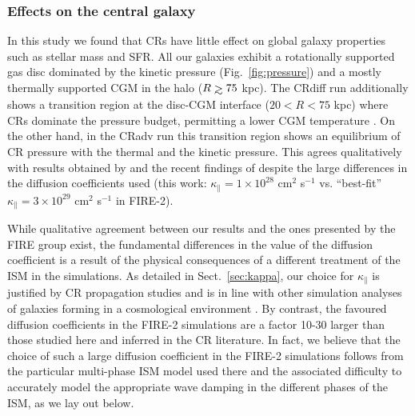 \documentclass[useAMS,usenatbib]{mnras}
\def\gtrsim{\mathrel{\hbox{\rlap{\hbox{\lower4pt\hbox{$\sim$}}}\hbox{$>$}}}}
\begin{document}
\subsubsection{Effects on the central galaxy}

In this study we found that CRs have little effect on global galaxy properties such as stellar mass and SFR. All our galaxies exhibit a rotationally supported gas disc dominated by the kinetic pressure (Fig.\ \ref{fig:pressure}) and a mostly thermally supported CGM in the halo ($R\gtrsim75$ kpc). The CRdiff run additionally shows a transition region at the disc-CGM interface ($20<R<75$ kpc) where CRs dominate the pressure budget, permitting a lower CGM temperature \citep[see also][figure 6]{Butsky2018}. On the other hand, in the CRadv run this transition region shows an equilibrium of CR pressure with the thermal and the kinetic pressure. This agrees qualitatively with results obtained by \citet[][figure 2]{Salem2016} and the recent findings of \citet{Hopkins2019} despite the large differences in the diffusion coefficients used (this work: $\kappa_\parallel=1\times10^{28}$ cm$^{2}$ s$^{-1}$ vs. ``best-fit'' $\kappa_\parallel=3\times10^{29}$ cm$^{2}$ s$^{-1}$ in FIRE-2). 

While qualitative agreement between our results and the ones presented by the FIRE group exist, the fundamental differences in the value of the diffusion coefficient is a result of the physical consequences of a different treatment of the ISM in the simulations. As detailed in Sect.~\ref{sec:kappa}, our choice for $\kappa_\parallel$ is justified by CR propagation studies \citep{Porter2017,Cerri2017,Evoli2017,Evoli2019,Evoli2020,Johannesson2019} and is in line with other simulation analyses of galaxies forming in a cosmological environment \citep{Salem2016}. By contrast, the favoured diffusion coefficients in the FIRE-2 simulations are a factor 10-30 larger than those studied here and inferred in the CR literature. 
In fact, we believe that the choice of such a large diffusion coefficient in the FIRE-2 simulations follows from the particular multi-phase ISM model used there and the associated difficulty to accurately model the appropriate wave damping in the different phases of the ISM, as we lay out below.
\end{document}
